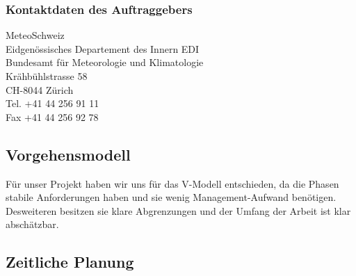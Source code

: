 \documentclass[a4paper,10pt]{article}
\begin{document}
\subsubsection{Kontaktdaten des Auftraggebers}
MeteoSchweiz\\
Eidgenössisches Departement des Innern EDI \\
Bundesamt für Meteorologie und Klimatologie\\
Krähbühlstrasse 58\\
CH-8044 Zürich\\
Tel.   +41 44 256 91 11 \\
Fax   +41 44 256 92 78\\

\subsection{Vorgehensmodell}
Für unser Projekt haben wir uns für das V-Modell entschieden, da die
Phasen stabile Anforderungen haben und sie wenig Management-Aufwand
benötigen. Desweiteren besitzen sie klare Abgrenzungen und der Umfang
der Arbeit ist klar abschätzbar. 

\subsection{Zeitliche Planung}
\end{document}

